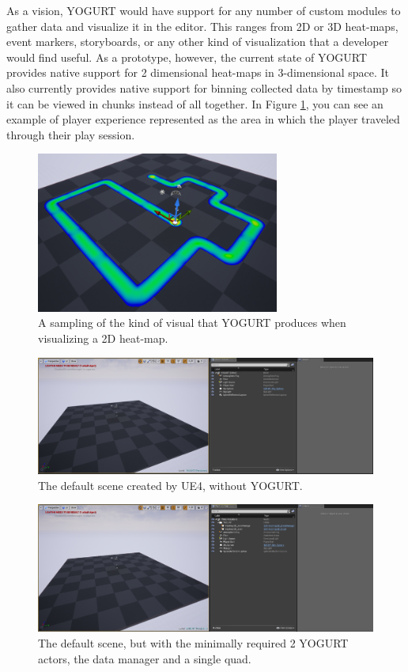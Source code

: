 \documentclass[journal]{IEEEtran}
\begin{document}
As a vision, YOGURT would have support for any number of custom modules to gather data and visualize it in the editor. This ranges from 2D or 3D heat-maps, event markers, storyboards, or any other kind of visualization that a developer would find useful. As a prototype, however, the current state of YOGURT provides native support for 2 dimensional heat-maps in 3-dimensional space. It also currently provides native support for binning collected data by timestamp so it can be viewed in chunks instead of all together. In Figure \ref{exampleOverivew}, you can see an example of player experience represented as the area in which the player traveled through their play session.

\begin{figure}[ht]
\includegraphics[width=8cm]{"scene_yogurt_postrun_focused"}
\caption{A sampling of the kind of visual that YOGURT produces when visualizing a 2D heat-map.}
\label{exampleOverivew}
\end{figure}

\begin{figure}
\includegraphics[width=\textwidth]{"scene_minimal"}
\caption{The default scene created by UE4, without YOGURT.}
\label{sceneMinimal}
\end{figure}

\begin{figure}
\includegraphics[width=\textwidth]{"scene_yogurt"}
\caption{The default scene, but with the minimally required 2 YOGURT actors, the data manager and a single quad.}
\label{sceneYogurt}
\end{figure}
\end{document}
